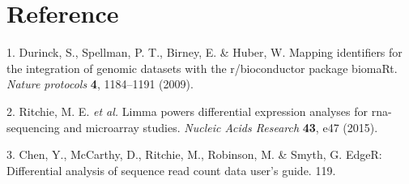 \documentclass[
]{article}
\newenvironment{cslreferences}%
  {}%
  {\par}
\begin{document}
\begin{center}\vspace{1.5cm}\end{center}

\hypertarget{bibliography}{%
\section*{Reference}\label{bibliography}}

\hypertarget{refs}{}
\begin{cslreferences}
\leavevmode\hypertarget{ref-MappingIdentifDurinc2009}{}%
1. Durinck, S., Spellman, P. T., Birney, E. \& Huber, W. Mapping identifiers for the integration of genomic datasets with the r/bioconductor package biomaRt. \emph{Nature protocols} \textbf{4}, 1184--1191 (2009).

\leavevmode\hypertarget{ref-LimmaPowersDiRitchi2015}{}%
2. Ritchie, M. E. \emph{et al.} Limma powers differential expression analyses for rna-sequencing and microarray studies. \emph{Nucleic Acids Research} \textbf{43}, e47 (2015).

\leavevmode\hypertarget{ref-EdgerDifferenChen}{}%
3. Chen, Y., McCarthy, D., Ritchie, M., Robinson, M. \& Smyth, G. EdgeR: Differential analysis of sequence read count data user's guide. 119.
\end{cslreferences}
\end{document}
